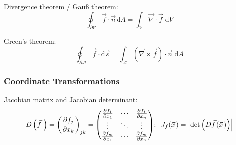			\noindent
			Divergence theorem / Gauß theorem:
			\begin{equation}
				\oint_{\partial\mathcal{V}}\vec{f}\cdot\vec{n}\,\mathrm{d}A=\int_{\mathcal{V}}\vec{\nabla}\cdot\vec{f}\;\mathrm{d}V
			\end{equation}

			\noindent
			Green's theorem:
			\begin{equation}
				\oint_{\partial\mathcal{A}}\vec{f}\cdot\mathrm{d}\vec{s}=\int_{\mathcal{A}}\left(\vec{\nabla}\times\vec{f}\right)\cdot\vec{n}\;\mathrm{d}A
			\end{equation}

		\subsubsection{Coordinate Transformations}
			\noindent
			Jacobian matrix and Jacobian determinant:
			\begin{equation}
				D\left(\vec{f}\,\right) = \left(\frac{\partial f_j}{\partial x_k}\right)_{jk}
				= \mqty(
				\frac{\partial f_1}{\partial x_1} & \dotsb & \frac{\partial f_1}{\partial x_n} \\
				\vdots & \ddots & \vdots \\
				\frac{\partial f_m}{\partial x_1} & \dotsb & \frac{\partial f_m}{\partial x_n} \\
				);\;\;J_f(\vec{x})=\abs{\det\left(D\vec{f}(\vec{x})\right)}
			\end{equation}

